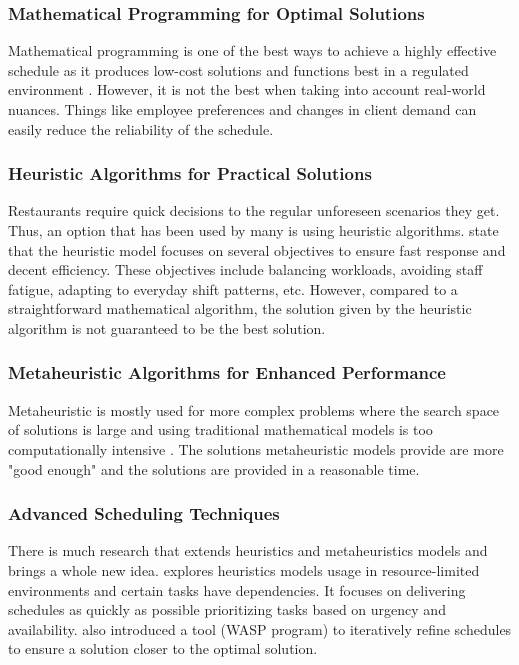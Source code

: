 \documentclass[a4paper,12pt, oneside]{report}
\begin{document}
\subsubsection{Mathematical Programming for Optimal Solutions}
 Mathematical programming is one of the best ways to achieve a highly effective schedule as it produces low-cost solutions and functions best in a regulated environment \citep{ernst2004staff}. However, it is not the best when taking into account real-world nuances. Things like employee preferences and changes in client demand can easily reduce the reliability of the schedule.\\

\subsubsection{Heuristic Algorithms for Practical Solutions}
Restaurants require quick decisions to the regular unforeseen scenarios they get. Thus, an option that has been used by many is using heuristic algorithms. \citet{caprara2003models} state that the heuristic model focuses on several objectives to ensure fast response and decent efficiency. These objectives include balancing workloads, avoiding staff fatigue, adapting to everyday shift patterns, etc. However, compared to a straightforward mathematical algorithm, the solution given by the heuristic algorithm is not guaranteed to be the best solution.\\

\subsubsection{Metaheuristic Algorithms for Enhanced Performance}
Metaheuristic is mostly used for more complex problems where the search space of solutions is large and using traditional mathematical models is too computationally intensive \citep{KonjaangJ.Kok2021MAfE}. The solutions metaheuristic models provide are more "good enough" and the solutions are provided in a reasonable time. \\

\subsubsection{Advanced Scheduling Techniques}
There is much research that extends heuristics and metaheuristics models and brings a whole new idea. \citet{thesen1978heuristic} explores heuristics models usage in resource-limited environments and certain tasks have dependencies. It focuses on delivering schedules as quickly as possible prioritizing tasks based on urgency and availability. \citet{thesen1978heuristic} also introduced a tool (WASP program) to iteratively refine schedules to ensure a solution closer to the optimal solution.\\
\end{document}
